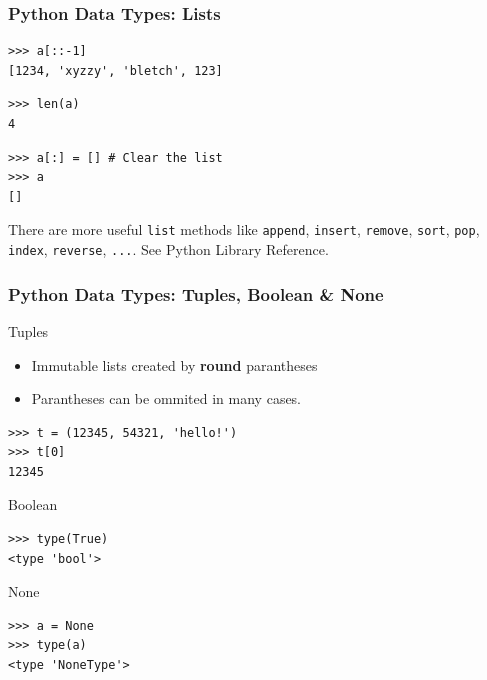 \documentclass[t,10pt,compress=false,usepdftitle=false]{beamer}
\begin{document}
\begin{frame}[fragile]
    \frametitle{Python Data Types: Lists}
    \begin{myColorBox}{0.9}{}
\begin{verbatim}
>>> a[::-1]
[1234, 'xyzzy', 'bletch', 123]
\end{verbatim}
    \end{myColorBox}
    \pause
    \begin{myColorBox}{0.9}{}
\begin{verbatim}
>>> len(a)
4
\end{verbatim}
    \end{myColorBox}
    \pause
    \begin{myColorBox}{0.9}{}
\begin{verbatim}
>>> a[:] = [] # Clear the list
>>> a
[]
\end{verbatim}
    \end{myColorBox}
    \pause
    There are more useful \verb#list# methods like \verb#append#, \verb#insert#, \verb#remove#, \verb#sort#,
    \verb#pop#, \verb#index#, \verb#reverse#, \verb#...#. See Python Library Reference.
\end{frame}


\begin{frame}[fragile]
    \frametitle{Python Data Types: Tuples, Boolean \& None}
    Tuples
    \begin{itemize}
        \item Immutable lists created by \textbf{round} parantheses
        \item Parantheses can be ommited in many cases.
    \end{itemize}
    \begin{myColorBox}{0.9}{}
\begin{verbatim}
>>> t = (12345, 54321, 'hello!')
>>> t[0]
12345
\end{verbatim}
    \end{myColorBox}
\pause
Boolean
        \begin{myColorBox}{0.9}{}
\begin{verbatim}
>>> type(True)
<type 'bool'>
\end{verbatim}
    \end{myColorBox}
\pause
None
        \begin{myColorBox}{0.9}{}
\begin{verbatim}
>>> a = None
>>> type(a)
<type 'NoneType'>
\end{verbatim}
    \end{myColorBox}
\pause

\end{frame}
\end{document}
